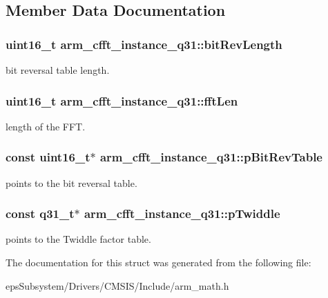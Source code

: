 \subsection{Member Data Documentation}
\hypertarget{structarm__cfft__instance__q31_a2250fa6b8fe73292c5418c50c0549f87}{
\subsubsection[{bit\-Rev\-Length}]{\setlength{\rightskip}{0pt plus 5cm}uint16\-\_\-t arm\-\_\-cfft\-\_\-instance\-\_\-q31\-::bit\-Rev\-Length}}\label{structarm__cfft__instance__q31_a2250fa6b8fe73292c5418c50c0549f87}
bit reversal table length. \hypertarget{structarm__cfft__instance__q31_a4406f23e8fd0bff8d555225612e2a2a8}{
\subsubsection[{fft\-Len}]{\setlength{\rightskip}{0pt plus 5cm}uint16\-\_\-t arm\-\_\-cfft\-\_\-instance\-\_\-q31\-::fft\-Len}}\label{structarm__cfft__instance__q31_a4406f23e8fd0bff8d555225612e2a2a8}
length of the F\-F\-T. \hypertarget{structarm__cfft__instance__q31_a8a464461649f023325ced1e10470f5d0}{
\subsubsection[{p\-Bit\-Rev\-Table}]{\setlength{\rightskip}{0pt plus 5cm}const uint16\-\_\-t$\ast$ arm\-\_\-cfft\-\_\-instance\-\_\-q31\-::p\-Bit\-Rev\-Table}}\label{structarm__cfft__instance__q31_a8a464461649f023325ced1e10470f5d0}
points to the bit reversal table. \hypertarget{structarm__cfft__instance__q31_af751114feb91de3ace8600e91bdd0872}{
\subsubsection[{p\-Twiddle}]{\setlength{\rightskip}{0pt plus 5cm}const q31\-\_\-t$\ast$ arm\-\_\-cfft\-\_\-instance\-\_\-q31\-::p\-Twiddle}}\label{structarm__cfft__instance__q31_af751114feb91de3ace8600e91bdd0872}
points to the Twiddle factor table. 

The documentation for this struct was generated from the following file\-:\begin{DoxyCompactItemize}
\item 
eps\-Subsystem/\-Drivers/\-C\-M\-S\-I\-S/\-Include/arm\-\_\-math.\-h\end{DoxyCompactItemize}
